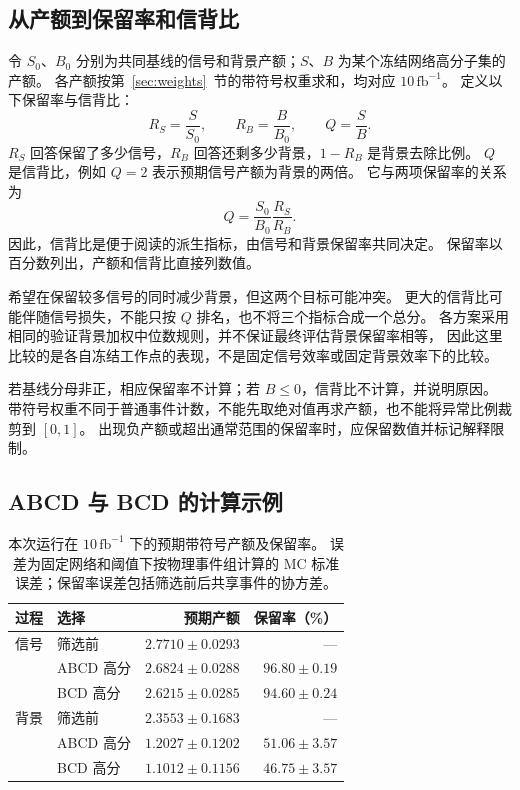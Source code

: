 \documentclass[11pt,a4paper,fontset=fandol,scheme=plain]{ctexart}
\begin{document}
\subsection{从产额到保留率和信背比}
令 $S_0$、$B_0$ 分别为共同基线的信号和背景产额；$S$、$B$ 为某个冻结网络高分子集的产额。
各产额按第~\ref{sec:weights}~节的带符号权重求和，均对应 $10\,\mathrm{fb}^{-1}$。
定义以下保留率与信背比：
\[
 R_S=\frac{S}{S_0},\qquad R_B=\frac{B}{B_0},\qquad Q=\frac{S}{B}.
\]
$R_S$ 回答保留了多少信号，$R_B$ 回答还剩多少背景，$1-R_B$ 是背景去除比例。
$Q$ 是信背比，例如 $Q=2$ 表示预期信号产额为背景的两倍。
它与两项保留率的关系为
\[
 Q=\frac{S_0}{B_0}\frac{R_S}{R_B}.
\]
因此，信背比是便于阅读的派生指标，由信号和背景保留率共同决定。
保留率以百分数列出，产额和信背比直接列数值。

希望在保留较多信号的同时减少背景，但这两个目标可能冲突。
更大的信背比可能伴随信号损失，不能只按 $Q$ 排名，也不将三个指标合成一个总分。
各方案采用相同的验证背景加权中位数规则，并不保证最终评估背景保留率相等，
因此这里比较的是各自冻结工作点的表现，不是固定信号效率或固定背景效率下的比较。

若基线分母非正，相应保留率不计算；若 $B\leq0$，信背比不计算，并说明原因。
带符号权重不同于普通事件计数，不能先取绝对值再求产额，也不能将异常比例裁剪到 $[0,1]$。
出现负产额或超出通常范围的保留率时，应保留数值并标记解释限制。

\subsection{ABCD 与 BCD 的计算示例}
\begin{table}[H]
\caption{本次运行在 $10\,\mathrm{fb}^{-1}$ 下的预期带符号产额及保留率。
误差为固定网络和阈值下按物理事件组计算的 MC 标准误差；保留率误差包括筛选前后共享事件的协方差。}
\label{tab:yields}
\centering
\begin{tabular}{llrr}
\toprule
过程 & 选择 & 预期产额 & 保留率（\%） \\
\midrule
信号 & 筛选前 & $2.7710\pm0.0293$ & --- \\
 & ABCD 高分 & $2.6824\pm0.0288$ & $96.80\pm0.19$ \\
 & BCD 高分 & $2.6215\pm0.0285$ & $94.60\pm0.24$ \\
背景 & 筛选前 & $2.3553\pm0.1683$ & --- \\
 & ABCD 高分 & $1.2027\pm0.1202$ & $51.06\pm3.57$ \\
 & BCD 高分 & $1.1012\pm0.1156$ & $46.75\pm3.57$ \\
\bottomrule
\end{tabular}
\end{table}
\end{document}
